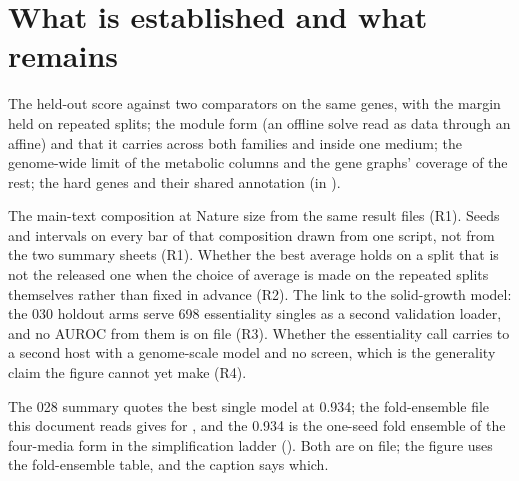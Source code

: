 
\section{What is established and what remains}
\label{sec:remaining}

 The held-out score against two comparators on the same genes, with
the margin held on \gnResplits{} repeated splits; the module form (an offline solve read
as data through an affine) and that it carries across both families and inside one
medium; the genome-wide limit of the metabolic columns and the gene graphs' coverage of
the rest; the hard genes and their shared annotation (in ).

 The main-text composition at Nature size from the same result
files (R1). Seeds and intervals on every bar of that composition drawn from one script,
not from the two summary sheets (R1). Whether the best average holds on a split that is
not the released one when the choice of average is made on the repeated splits
themselves rather than fixed in advance (R2). The link to the solid-growth model: the
030 holdout arms serve 698 essentiality singles as a second validation loader, and no
AUROC from them is on file (R3). Whether the essentiality call carries to a second host
with a genome-scale model and no screen, which is the generality claim the figure cannot
yet make (R4).

 The 028 summary quotes the best single model at 0.934; the
fold-ensemble file this document reads gives \gbestSingle{} for \gbestSingleName{}, and
the 0.934 is the one-seed fold ensemble of the four-media form in the simplification
ladder (\gladfourSolveCountsEns{}). Both are on file; the figure uses the fold-ensemble
table, and the caption says which.
